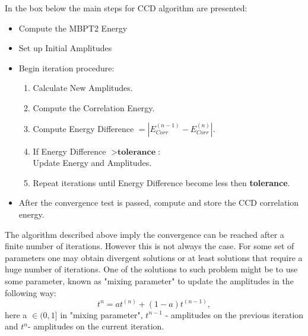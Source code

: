 In the box below the main steps for CCD algorithm are presented: 
\begin{tcolorbox}
	\begin{itemize}
		\item Compute the MBPT2 Energy
		\item Set up Initial Amplitudes
		\item Begin iteration procedure:
		\begin{enumerate} 
			\item Calculate New Amplitudes.
			\item Compute the Correlation Energy.
			\item Compute Energy Difference $=|E_{Corr}^{(n-1)} - E_{Corr}^{(n)}|$.
			\item If Energy Difference $ > \textbf{tolerance}$:\\
			 Update Energy and Amplitudes.
			\item Repeat iterations until Energy Difference become less then \textbf{tolerance}.
		\end{enumerate} 
		\item After the convergence test is passed, compute and store the CCD correlation energy.
	\end{itemize}
\end{tcolorbox}
The algorithm described above imply the convergence can be reached after a finite number of iterations. However this is not always the case. For some set of parameters one may obtain divergent solutions or at least solutions that require a huge number of iterations. One of the solutions to such problem might be to use some parameter, known as "mixing parameter" to update the amplitudes in the following way:
\begin{equation}\label{eq:mizampl}
t^{n} = at^(n) + (1-a)t^{(n-1)},
\end{equation}
here a $\in (0,1]$ in "mixing parameter", $t^{n-1}$ - amplitudes on the previous iteration and $t^{n}$- amplitudes on the current iteration.\\

